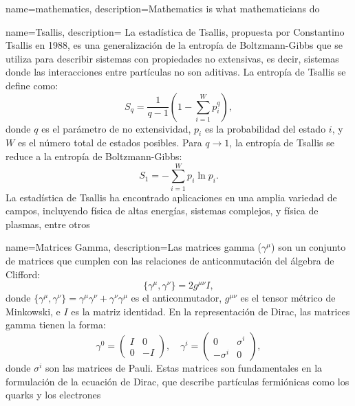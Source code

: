 
{
    name=mathematics,
    description={Mathematics is what mathematicians do}
}

{
    name=Tsallis,
    description={
        La estadística de Tsallis, propuesta por Constantino Tsallis en 1988, es una generalización de la entropía de Boltzmann-Gibbs que se utiliza para describir sistemas con propiedades no extensivas, es decir, sistemas donde las interacciones entre partículas no son aditivas. La entropía de Tsallis se define como:
        \[
            S_q = \frac{1}{q-1} \left( 1 - \sum_{i=1}^W p_i^q \right),
        \]
        donde \( q \) es el parámetro de no extensividad, \( p_i \) es la probabilidad del estado \( i \), y \( W \) es el número total de estados posibles. Para \( q \to 1 \), la entropía de Tsallis se reduce a la entropía de Boltzmann-Gibbs:
        \[
            S_1 = -\sum_{i=1}^W p_i \ln p_i.
        \]
        La estadística de Tsallis ha encontrado aplicaciones en una amplia variedad de campos, incluyendo física de altas energías, sistemas complejos, y física de plasmas, entre otros}
}

{
    name=Matrices Gamma,
    description={Las matrices gamma (\( \gamma^\mu \)) son un conjunto de matrices que cumplen con las relaciones de anticonmutación del álgebra de Clifford:
    \[
        \{ \gamma^\mu, \gamma^\nu \} = 2 g^{\mu \nu} I,
    \]
    donde \( \{ \gamma^\mu, \gamma^\nu \} = \gamma^\mu \gamma^\nu + \gamma^\nu \gamma^\mu \) es el anticonmutador, \( g^{\mu \nu} \) es el tensor métrico de Minkowski, e \( I \) es la matriz identidad. En la representación de Dirac, las matrices gamma tienen la forma:
    \[
        \gamma^0 = \begin{pmatrix}
            I & 0 \\
            0 & -I
        \end{pmatrix}, \quad
        \gamma^i = \begin{pmatrix}
            0 & \sigma^i \\
            -\sigma^i & 0
        \end{pmatrix},
    \]
    donde \( \sigma^i \) son las matrices de Pauli. Estas matrices son fundamentales en la formulación de la ecuación de Dirac, que describe partículas fermiónicas como los quarks y los electrones}
}